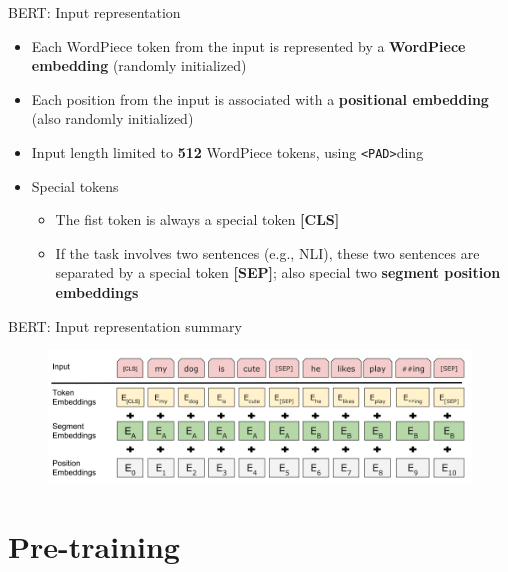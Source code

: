 \documentclass[12pt,aspectratio=169,handout]{beamer}
\begin{document}
\begin{frame}{BERT: Input representation}
	
	\begin{itemize}
		\item Each WordPiece token from the input is represented by a \textbf{WordPiece embedding} (randomly initialized)
		\item Each position from the input is associated with a \textbf{positional embedding} (also randomly initialized)
		\item Input length limited to \textbf{512} WordPiece tokens, using \texttt{<PAD>}ding
		\item Special tokens
		\begin{itemize}
			\item The fist token is always a special token \textbf{[CLS]}
			\item If the task involves two sentences (e.g., NLI), these two sentences are separated by a special token \textbf{[SEP]}; also special two \textbf{segment position embeddings} 
		\end{itemize}
		
	\end{itemize}
	
\end{frame}




\begin{frame}{BERT: Input representation summary}
	
	\begin{figure}
		\includegraphics[width=\linewidth]{img/bert-input.png}	
	\end{figure}
	
\end{frame}



\section{Pre-training}
\end{document}
